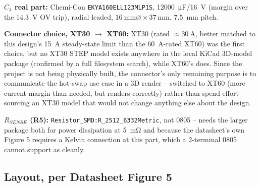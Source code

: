 \documentclass[11pt,letterpaper]{article}
\begin{document}
\textbf{$C_4$ real part:} Chemi-Con \texttt{EKYA160ELL123MLP1S}, \SI{12000}{\micro\farad}/\SI{16}{\volt}
(margin over the \SI{14.3}{\volt} OV trip), radial leaded, $\SI{16}{\milli\meter}\varnothing \times
\SI{37}{\milli\meter}$, \SI{7.5}{\milli\meter} pitch.

\textbf{Connector choice, XT30 $\rightarrow$ XT60:} XT30 (rated $\approx\SI{30}{\ampere}$, better matched
to this design's \SI{15}{\ampere} steady-state limit than the \SI{60}{\ampere}-rated XT60) was the first
choice, but no XT30 STEP model exists anywhere in the local KiCad 3D-model package (confirmed by a full
filesystem search), while XT60's does. Since the project is not being physically built, the connector's
only remaining purpose is to communicate the hot-swap use case in a 3D render -- switched to XT60 (more
current margin than needed, but renders correctly) rather than spend effort sourcing an XT30 model that
would not change anything else about the design.

\textbf{$R_{SENSE}$ (R5):} \texttt{Resistor\_SMD:R\_2512\_6332Metric}, not 0805 -- needs the larger package
both for power dissipation at \SI{5}{\milli\ohm} and because the datasheet's own Figure 5 requires a
Kelvin connection at this part, which a 2-terminal 0805 cannot support as cleanly.

\subsection{Layout, per Datasheet Figure 5}
\end{document}
